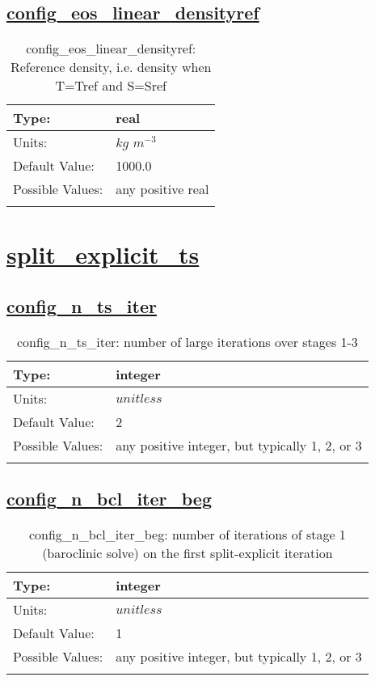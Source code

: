 \subsection[config\_eos\_linear\_densityref]{\hyperref[sec:nm_tab_eos_linear]{config\_eos\_linear\_densityref}}
\label{subsec:nm_sec_config_eos_linear_densityref}
\begin{center}
\begin{longtable}{| p{2.0in} || p{4.0in} |}
    \hline
    Type: & real \\
    \hline
    Units: & $kg$ $m^{-3}$ \\
    \hline
    Default Value: & 1000.0 \\
    \hline
    Possible Values: & any positive real \\
    \hline
    \caption{config\_eos\_linear\_densityref: Reference density, i.e. density when T=Tref and S=Sref}
\end{longtable}
\end{center}
\section[split\_explicit\_ts]{\hyperref[sec:nm_tab_split_explicit_ts]{split\_explicit\_ts}}
\label{sec:nm_sec_split_explicit_ts}
\subsection[config\_n\_ts\_iter]{\hyperref[sec:nm_tab_split_explicit_ts]{config\_n\_ts\_iter}}
\label{subsec:nm_sec_config_n_ts_iter}
\begin{center}
\begin{longtable}{| p{2.0in} || p{4.0in} |}
    \hline
    Type: & integer \\
    \hline
    Units: & $unitless$ \\
    \hline
    Default Value: & 2 \\
    \hline
    Possible Values: & any positive integer, but typically 1, 2, or 3 \\
    \hline
    \caption{config\_n\_ts\_iter: number of large iterations over stages 1-3}
\end{longtable}
\end{center}
\subsection[config\_n\_bcl\_iter\_beg]{\hyperref[sec:nm_tab_split_explicit_ts]{config\_n\_bcl\_iter\_beg}}
\label{subsec:nm_sec_config_n_bcl_iter_beg}
\begin{center}
\begin{longtable}{| p{2.0in} || p{4.0in} |}
    \hline
    Type: & integer \\
    \hline
    Units: & $unitless$ \\
    \hline
    Default Value: & 1 \\
    \hline
    Possible Values: & any positive integer, but typically 1, 2, or 3 \\
    \hline
    \caption{config\_n\_bcl\_iter\_beg: number of iterations of stage 1 (baroclinic solve) on the first split-explicit iteration}
\end{longtable}
\end{center}
